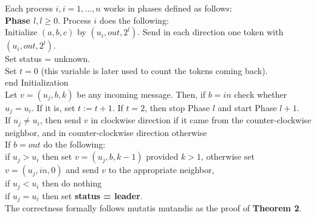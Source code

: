 \documentclass[a4paper]{article}
\begin{document}
\begin{samepage}
\begin{algorithm}
Each process $i, i = 1, \ldots, n$ works in phases defined as follows: \\
\textbf{Phase $l, l \geq 0$}. Process $i$ does the following: \\
Initialize $(a, b, c)$ by $(u_{i}, out, 2^{l})$. Send in each direction one token with $(u_{i}, out, 2^{l})$. \\
Set status = unknown. \\
Set $t = 0$ (this variable is later used to count the tokens coming back). \\
end Initialization \\
Let $v = (u_{j}, b, k)$ be any incoming message. Then, if $b = in$ check whether $u_{j} = u_{i}$. If it is, set $t := t + 1$. If $t = 2$, then stop Phase $l$ and start Phase $l + 1$. \\
If $u_{j} \neq u_{i}$, then send $v$ in clockwise direction if it came from the counter-clockwise neighbor, and in counter-clockwise direction otherwise \\
If $b = out$ do the following: \\
\indent if $u_{j} > u_{i}$ then set $v = (u_{j}, b, k - 1)$ provided $k > 1$, otherwise set $v = (u_{j}, in, 0)$ and send $v$ to the appropriate neighbor, \\
\indent if $u_{j} < u_{i}$ then do nothing \\
\indent if $u_{j} = u_{i}$ then set \textbf{status = leader}. \\
The correctness formally follows mutatis mutandis as the proof of \textbf{Theorem 2}.
\end{algorithm}
\end{samepage}
\end{document}
